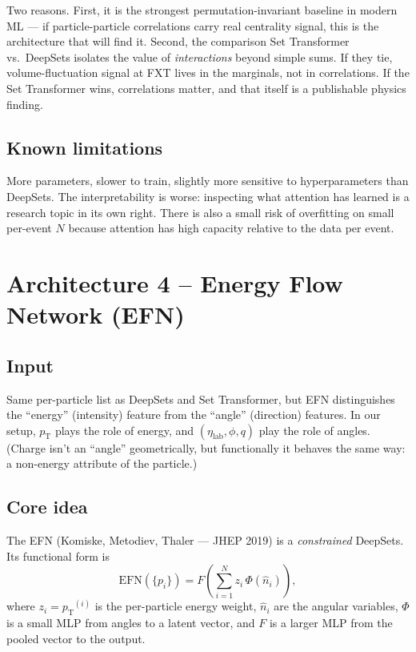 \documentclass[11pt]{article}
\newcommand{\pT}{\ensuremath{p_{\text{T}}}}
\newcommand{\etalab}{\ensuremath{\eta_{\text{lab}}}}
\begin{document}
Two reasons. First, it is the strongest permutation-invariant
baseline in modern ML --- if particle-particle correlations carry real
centrality signal, this is the architecture that will find it.
Second, the comparison Set Transformer vs.\ DeepSets isolates the
value of \emph{interactions} beyond simple sums. If they tie,
volume-fluctuation signal at FXT lives in the marginals, not in
correlations. If the Set Transformer wins, correlations matter, and
that itself is a publishable physics finding.

\subsection{Known limitations}

More parameters, slower to train, slightly more sensitive to
hyperparameters than DeepSets. The interpretability is worse:
inspecting what attention has learned is a research topic in its own
right. There is also a small risk of overfitting on small per-event
$N$ because attention has high capacity relative to the data per
event.

\section{Architecture 4 -- Energy Flow Network (EFN)}
\label{sec:efn}

\subsection{Input}

Same per-particle list as DeepSets and Set Transformer, but EFN
distinguishes the ``energy'' (intensity) feature from the ``angle''
(direction) features. In our setup, $\pT$ plays the role of energy,
and $(\etalab, \phi, q)$ play the role of angles. (Charge isn't an
``angle'' geometrically, but functionally it behaves the same way: a
non-energy attribute of the particle.)

\subsection{Core idea}

The EFN (Komiske, Metodiev, Thaler --- JHEP 2019) is a
\emph{constrained} DeepSets. Its functional form is
\[
   \mathrm{EFN}(\{p_i\})
   = F\!\left(\sum_{i=1}^N z_i \, \Phi(\hat{n}_i)\right),
\]
where $z_i = \pT^{(i)}$ is the per-particle energy weight,
$\hat{n}_i$ are the angular variables, $\Phi$ is a small MLP from
angles to a latent vector, and $F$ is a larger MLP from the pooled
vector to the output.
\end{document}
